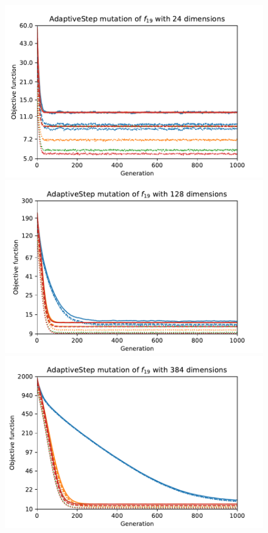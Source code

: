 \begin{figure}[ht!]
    \begin{minipage}[t]{0.32\textwidth}
        \centering
        \includegraphics[width=\textwidth]{img/runs/fitness_es_mutation_f19_dim24_AdaptiveStep.pdf}
    \end{minipage}
    \hfill
    \begin{minipage}[t]{0.32\textwidth}
        \centering
        \includegraphics[width=\textwidth]{img/runs/fitness_es_mutation_f19_dim128_AdaptiveStep.pdf}
    \end{minipage}
    \hfill
    \begin{minipage}[t]{0.32\textwidth}
        \centering
        \includegraphics[width=\textwidth]{img/runs/fitness_es_mutation_f19_dim384_AdaptiveStep.pdf}
    \end{minipage}


\end{figure}

